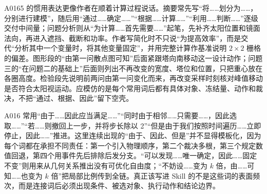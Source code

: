 A0165 的惯用表达更像作者在顺着计算过程说话。摘要常先写“将……划分为……，分别进行建模”，随后用“通过……确定……”“根据……计算……”“利用……判断……”逐级交付中间量；问题分析则从“为计算……首先需要……”起笔，先补齐太阳位置和镜面法向，再进入遮挡、截断和功率。作者写简化时不只说“为提高效率”，而是交代“分析其中一个变量时，将其他变量固定”，并用完整计算作基准说明 $2\times2$ 栅格的偏差。图形段的“由第一问散点图可知”后面紧跟塔向南移动这一设计动作；问题三的“在问题二的基础上”后面则列出不再改变的宽度、塔位和位置，只把重心放在各圈高度。检验段先说明前两问由第一问变化而来，再改变采样时刻核对峰值移动是否符合太阳视运动。应模仿的是每个常用词后都有具体对象、冻结量、动作和裁决，不把“通过、根据、因此”留下空壳。

A016 常用“由于……因此应当满足……”“同时由于相邻……只需要……，因此选取……”“若……则撤回上一步，并将步长除以 2”“但是由于我们按照时间遍历……立即停止，因此……”推进。这里连续出现的“由于、因此、但是”并不显得模板化，因为每个词都在承担不同责任：第一个引入物理顺序，第二个裁决多根，第三个规定数值回退，第四个用事件先后排除后发分支。“可以发现……唯一确定，因此……固定不变”则用来从几何关系推出没有可优化自由度；“不妨设……变为 $k$ 倍，由……可知……也变为 $k$ 倍”把局部比例传到全链。真正该写进 Skill 的不是这些词的表面频次，而是连接词后必须出现条件、被选对象、执行动作和结论边界。

